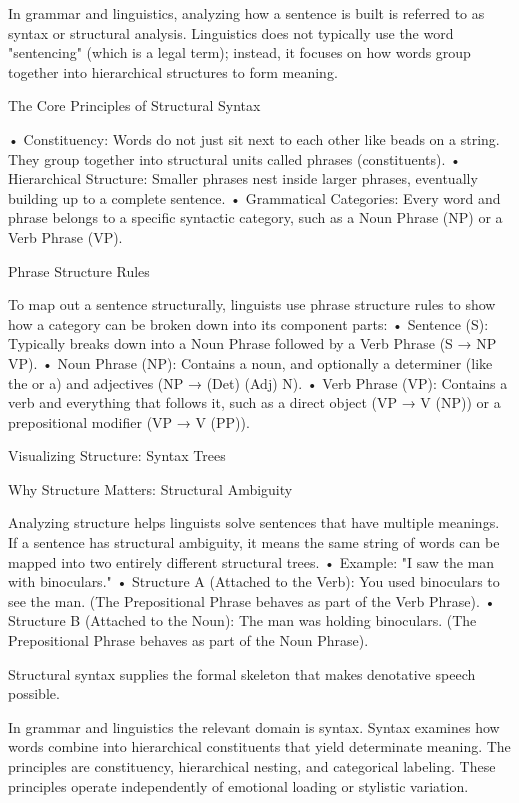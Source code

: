In grammar and linguistics, analyzing how a sentence is built is referred to as syntax or structural analysis. Linguistics does not typically use the word "sentencing" (which is a legal term); instead, it focuses on how words group together into hierarchical structures to form meaning.

The Core Principles of Structural Syntax

• Constituency: Words do not just sit next to each other like beads on a string. They group together into structural units called phrases (constituents).
• Hierarchical Structure: Smaller phrases nest inside larger phrases, eventually building up to a complete sentence.
• Grammatical Categories: Every word and phrase belongs to a specific syntactic category, such as a Noun Phrase (NP) or a Verb Phrase (VP).

Phrase Structure Rules

To map out a sentence structurally, linguists use phrase structure rules to show how a category can be broken down into its component parts:
• Sentence (S): Typically breaks down into a Noun Phrase followed by a Verb Phrase (S → NP VP).
• Noun Phrase (NP): Contains a noun, and optionally a determiner (like the or a) and adjectives (NP → (Det) (Adj) N).
• Verb Phrase (VP): Contains a verb and everything that follows it, such as a direct object (VP → V (NP)) or a prepositional modifier (VP → V (PP)).

Visualizing Structure: Syntax Trees

Why Structure Matters: Structural Ambiguity

Analyzing structure helps linguists solve sentences that have multiple meanings. If a sentence has structural ambiguity, it means the same string of words can be mapped into two entirely different structural trees.
• Example: "I saw the man with binoculars."
• Structure A (Attached to the Verb): You used binoculars to see the man. (The Prepositional Phrase behaves as part of the Verb Phrase).
• Structure B (Attached to the Noun): The man was holding binoculars. (The Prepositional Phrase behaves as part of the Noun Phrase).

Structural syntax supplies the formal skeleton that makes denotative speech possible.

In grammar and linguistics the relevant domain is syntax. Syntax examines how words combine into hierarchical constituents that yield determinate meaning. The principles are constituency, hierarchical nesting, and categorical labeling. These principles operate independently of emotional loading or stylistic variation.

